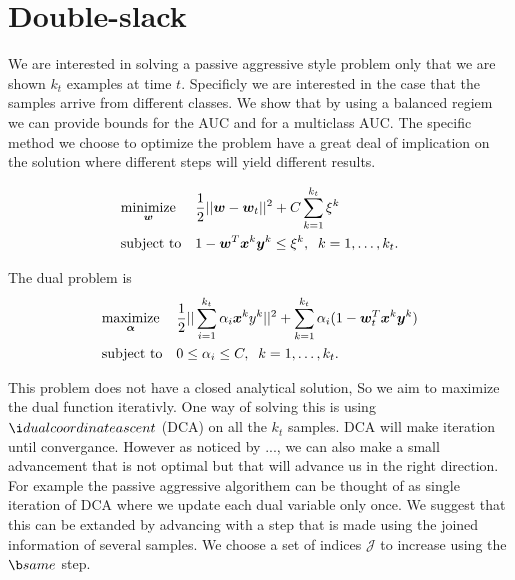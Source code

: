 \section{Double-slack}

We are interested in solving a passive aggressive style problem only that we are shown $k_t$ examples at time $t$. Specificly we are interested in the case that the samples arrive from different classes. We show that by using a balanced regiem we can provide bounds for the AUC and for a multiclass AUC. The specific method we choose to optimize the problem have a great deal of implication on the solution where different steps will yield different results.

\begin{equation*}
\begin{aligned}
& \underset{\bm{w}}{\text{minimize}}
& & \frac{1}{2} || \bm{w} - \bm{w}_t ||^2 + C \sum\limits_{k=1}^{k_t}{\xi^k} \\
& \text{subject to}
& & 1 - \bm{w}^T \bm{x}^k \bm{y}^k \leq \xi^k, \;
 \; k = 1, \ldots, k_t.
\end{aligned}
\end{equation*}


The dual problem is 
\begin{equation*}
\begin{aligned}
& \underset{\bm{\alpha}}{\text{maximize}}
& & \frac{1}{2} || \sum\limits_{i=1}^{k_t} {\alpha_i \bm{x}^k y^k}||^2 + \sum\limits_{k=1}^{k_t} {\alpha_i (1 - \bm{w}_t^T \bm{x}^k \bm{y}^k }) \\
& \text{subject to}
& & 0 \leq \alpha_i \leq C, \;
 \; k = 1, \ldots, k_t.
\end{aligned}
\end{equation*}


This problem does not have a closed analytical solution, So we aim to maximize the dual function iterativly. One way of solving this is using ${\i dual coordinate ascent}$ (DCA) on all the $k_t$ samples. DCA will make iteration until convergance. However as noticed by ...,  we can also make a small advancement that is not optimal but that will advance us in the right direction. For example the passive aggressive algorithem can be thought of as single iteration of DCA where we update each dual variable only once. We suggest that this can be extanded by advancing with a step that is made using the joined information of several samples. We choose a set of indices $\mathcal{J} $ to increase using the ${\b same }$ step.

